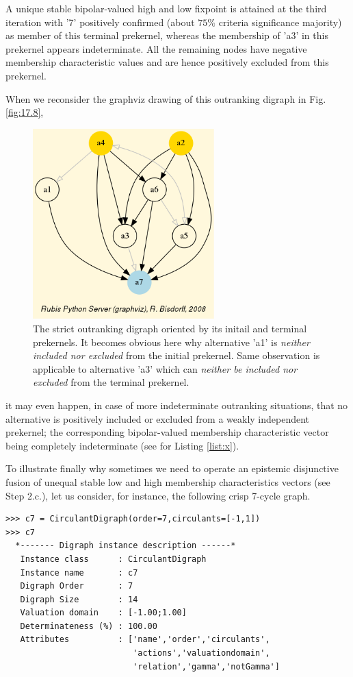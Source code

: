 A unique stable bipolar-valued high and low fixpoint is attained at the third iteration with '7' positively confirmed (about $75\%$ criteria significance majority) as member of this terminal prekernel, whereas the membership of 'a3' in this prekernel appears indeterminate. All the remaining nodes have negative membership characteristic values and are hence positively excluded from this prekernel.

When we reconsider the graphviz drawing of this outranking digraph in Fig. \ref{fig:17.8},
\begin{figure}[h]
\sidecaption
\includegraphics[width=7cm]{Figures/bestWorstOrientation.png}
\caption{The strict outranking digraph oriented by its initail and terminal prekernels. It becomes obvious here why alternative 'a1' is \emph{neither included nor excluded} from the initial prekernel. Same observation is applicable to alternative 'a3' which can \emph{neither be included nor excluded} from the terminal prekernel.}
\end{figure}
it may even happen, in case of more indeterminate outranking situations, that no alternative  is positively included or excluded from a weakly independent prekernel; the corresponding bipolar-valued membership characteristic vector being completely indeterminate (see for Listing \ref{list:x}).

To illustrate finally why sometimes we need to operate an epistemic disjunctive fusion of unequal stable low and high membership characteristics vectors (see Step 2.c.), let us consider, for instance, the following crisp 7-cycle graph.
\begin{lstlisting}
>>> c7 = CirculantDigraph(order=7,circulants=[-1,1])
>>> c7			     
  *------- Digraph instance description ------*
   Instance class      : CirculantDigraph
   Instance name       : c7
   Digraph Order       : 7
   Digraph Size        : 14
   Valuation domain    : [-1.00;1.00]
   Determinateness (%) : 100.00
   Attributes          : ['name','order','circulants',
                          'actions','valuationdomain',
                          'relation','gamma','notGamma']
\end{lstlisting}		       

